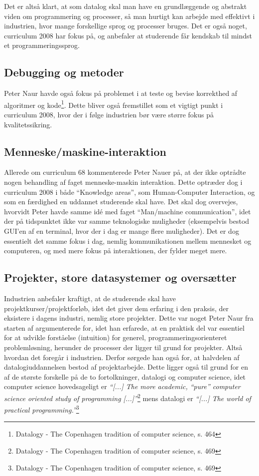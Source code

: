 \documentclass[10pt,a4paper]{article}
\newcommand{\citat}[2]{\vspace{0.1cm}\newline\textit{``#1''}\hspace{0.1cm}\footnote{#2}\vspace{0.1cm}\newline}
\begin{document}
Det er altså klart, at som datalog skal man have en grundlæggende og abstrakt
viden om programmering og processer, så man hurtigt kan arbejde med effektivt i
industrien, hvor mange forskellige sprog og processer bruges. Det er også noget,
curriculum 2008 har fokus på, og anbefaler at studerende får kendskab til mindst
et programmeringssprog.

\subsection{Debugging og metoder}
Peter Naur havde også fokus på problemet i at teste og bevise korrekthed af
algoritmer og kode\footnote{Datalogy - The Copenhagen tradition
    of computer science, s. 464}. Dette bliver også fremstillet som et vigtigt punkt i
curriculum 2008, hvor der i følge industrien bør være større fokus på
kvalitetssikring. 

\subsection{Menneske/maskine-interaktion}
Allerede om curriculum 68 kommenterede Peter Nauer på, at der ikke optrådte
nogen behandling af faget menneske-maskin interaktion. Dette optræder dog i
curriculum 2008 i både ``Knowledge areas'', som Human-Computer Interaction, og
som en færdighed en uddannet studerende skal have. Det skal dog overvejes,
hvorvidt Peter havde samme idé med faget ``Man/machine communication'', idet der
på tidspunktet ikke var samme teknologiske muligheder (eksempelvis bestod GUI'en
af en terminal, hvor der i dag er mange flere muligheder). Det er dog essentielt
det samme fokus i dag, nemlig kommunikationen mellem mennesket og computeren, og
med mere fokus på interaktionen, der fylder meget mere.

\subsection{Projekter, store datasystemer og oversætter}
Industrien anbefaler kraftigt, at de studerende skal have
projektkurser/projektforløb, idet det giver dem erfaring i den praksis, der
eksistere i dagens industri, nemlig store projekter. Dette var noget Peter Naur
fra starten af argumenterede for, idet han erfarede, at en praktisk del var
essentiel for at udvikle forståelse (intuition) for generel,
programmeringsorienteret problemløsning, herunder de processer der ligger til
grund for projekter. Altså hvordan det foregår i industrien. Derfor sørgede han
også for, at halvdelen af datalogiuddannelsen bestod af projektarbejde. Dette
ligger også til grund for en af de største forskelle på de to fortolkninger,
datalogi og computer science, idet computer science hovedsageligt er
\citat{[...] The more academic, ``pure'' computer science oriented study of
    programming [...]}{Datalogy - The Copenhagen tradition of computer science,
    s. 469} mens datalogi er \citat{[...] The world of practical
    programming.}{Datalogy - The Copenhagen tradition of computer science, s.
    469}
\end{document}
